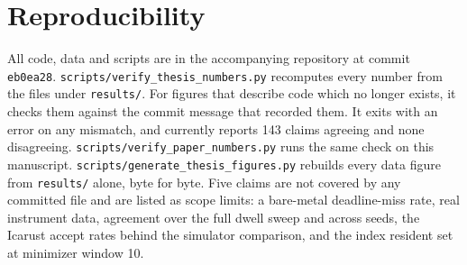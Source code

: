 \documentclass[conference]{IEEEtran}
\begin{document}
\section*{Reproducibility}

All code, data and scripts are in the accompanying repository at commit \texttt{eb0ea28}.
\texttt{scripts/verify\_thesis\_numbers.py} recomputes every number from the files under
\texttt{results/}. For figures that describe code which no longer exists, it checks them against
the commit message that recorded them. It exits with an error on any mismatch, and currently
reports 143 claims agreeing and none disagreeing. \texttt{scripts/verify\_paper\_numbers.py}
runs the same check on this manuscript. \texttt{scripts/generate\_thesis\_figures.py} rebuilds
every data figure from \texttt{results/} alone, byte for byte. Five claims are not covered by any
committed file and are listed as scope limits: a bare-metal deadline-miss rate, real instrument
data, agreement over the full dwell sweep and across seeds, the Icarust accept rates behind the
simulator comparison, and the index resident set at minimizer window 10.
\end{document}
